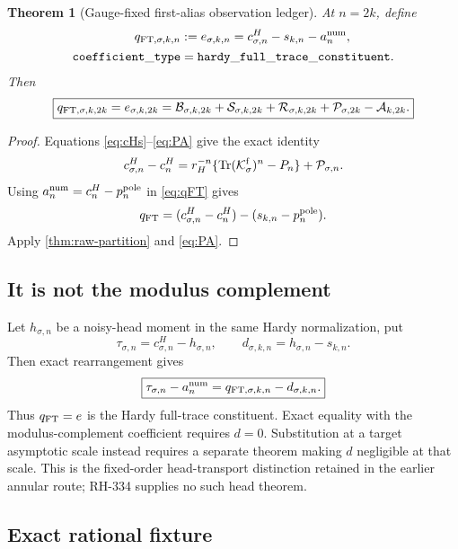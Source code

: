 \documentclass[11pt]{article}
\newtheorem{theorem}{Theorem}[section]
\theoremstyle{remark}
\newcommand{\Tr}{\operatorname{Tr}}
\newcommand{\cA}{\mathcal A}
\newcommand{\cB}{\mathcal B}
\newcommand{\cK}{\mathcal K}
\newcommand{\cP}{\mathcal P}
\newcommand{\cR}{\mathcal R}
\newcommand{\cS}{\mathcal S}
\begin{document}
\begin{theorem}[Gauge-fixed first-alias observation ledger]
\label{thm:first-alias-ledger}
At $n=2k$, define
\begin{align}
 q_{{\rm FT},\sigma,k,n}
 &:=e_{\sigma,k,n}
 =c^H_{\sigma,n}-s_{k,n}-a_n^{\rm num},
 \label{eq:qFT}\\
 \mathtt{coefficient\_type}
 &=\mathtt{hardy\_full\_trace\_constituent}.
 \label{eq:qFT-type}
\end{align}
Then
\begin{equation}\label{eq:five-slot}
 \boxed{
 q_{{\rm FT},\sigma,k,2k}
 =e_{\sigma,k,2k}
 =\cB_{\sigma,k,2k}+\cS_{\sigma,k,2k}
  +\cR_{\sigma,k,2k}+\cP_{\sigma,2k}-\cA_{k,2k}.}
\end{equation}
\end{theorem}

\begin{proof}
Equations \eqref{eq:cHs}--\eqref{eq:PA} give the exact identity
\[
 c^H_{\sigma,n}-c^H_n
 =r_H^{-n}\{\Tr(\cK_\sigma^{\rm f})^n-P_n\}
  +\cP_{\sigma,n}.
\]
Using $a_n^{\rm num}=c^H_n-p_n^{\rm pole}$ in \eqref{eq:qFT} gives
\[
 q_{\rm FT}=(c^H_{\sigma,n}-c^H_n)
 -(s_{k,n}-p_n^{\rm pole}).
\]
Apply \cref{thm:raw-partition} and \eqref{eq:PA}.
\end{proof}

\subsection{It is not the modulus complement}

Let $h_{\sigma,n}$ be a noisy-head moment in the same Hardy normalization,
put
\begin{equation}\label{eq:tau-d}
 \tau_{\sigma,n}=c^H_{\sigma,n}-h_{\sigma,n},
 \qquad
 d_{\sigma,k,n}=h_{\sigma,n}-s_{k,n}.
\end{equation}
Then exact rearrangement gives
\begin{equation}\label{eq:modulus-relation}
 \boxed{
 \tau_{\sigma,n}-a_n^{\rm num}
 =q_{{\rm FT},\sigma,k,n}-d_{\sigma,k,n}.}
\end{equation}
Thus $q_{\rm FT}=e$ is the Hardy full-trace constituent.  Exact equality with
the modulus-complement coefficient requires $d=0$.  Substitution at a target
asymptotic scale instead requires a separate theorem making $d$ negligible at
that scale.  This is the fixed-order head-transport distinction retained in
the earlier annular route; RH-334 supplies no such head theorem.

\subsection{Exact rational fixture}
\end{document}
